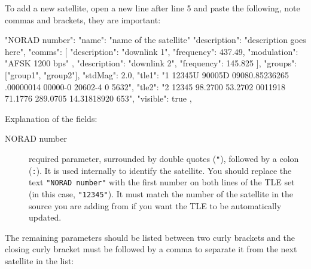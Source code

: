 
To add a new satellite, open a new line after line 5 and paste the following, note commas and brackets, they are important:
\begin{configfileScr}
"NORAD number": 
{
  "name": "name of the satellite"
  "description": "description goes here",
  "comms": [
     {
  	"description": "downlink 1",
  	"frequency": 437.49,
  	"modulation": "AFSK 1200 bps"
     },
     {
  	"description": "downlink 2",
  	"frequency": 145.825
     }
  ],
  "groups": ["group1", "group2"],
  "stdMag": 2.0,
  "tle1": "1 12345U 90005D   09080.85236265  .00000014  00000-0  20602-4 0  5632",
  "tle2": "2 12345 98.2700  53.2702 0011918  71.1776 289.0705 14.31818920   653",
  "visible": true
},
\end{configfileScr}
Explanation of the fields:

\begin{description}
\item[NORAD number]  required parameter, surrounded by double quotes (\texttt{"}),
followed by a colon (\texttt{:}). It is used internally to identify the
satellite. You should replace the text \texttt{"NORAD number"} with the first number on both lines of the TLE set (in this case, \texttt{"12345"}). It must match the number of the satellite in the source you are adding from if you want the TLE to be automatically updated.
\end{description}
The remaining parameters should be listed between two curly brackets and the closing curly bracket must be followed by a comma to separate it from the next satellite in the list:

